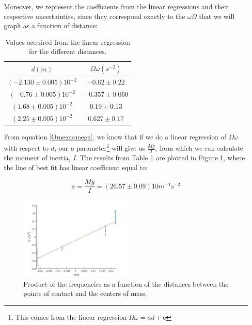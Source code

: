 \documentclass[a4paper,12pt]{article}
\begin{document}
Moreover, we represent the coefficients from the linear regressions and their respective uncertainties, since they correspond exactly to the $\omega \Omega$ that we will graph as a function of distance:

\begin{table}[H]
	\centering
  \caption{Values acquired from the linear regression for the different distances.}
  \begin{tabular}{|c|c|}
    \hline
    $d(m)$ & $\Omega \omega (s^{-2})$\\
        \hline
    $(-2.130 \pm 0.005) 10^{-2}$  & $-0.62 \pm 0.22$ \\
    \hline
    $(-0.76 \pm 0.005) 10^{-2}$ & $-0.357 \pm 0.060$ \\
    \hline
    $(1.68 \pm 0.005)10^{-2 }$ & $0.19 \pm 0.13$\\
    \hline
    $(2.25 \pm 0.005)10^{-2}$ & $0.627 \pm 0.17$\\
    \hline
  \end{tabular}
  \label{tabl:Omom}
\end{table}

From equation \eqref{Omegaomega}, we know that if we do a linear regression of $\Omega \omega$ with respect to $d$, our $a$ parameter\footnote{This comes from the linear regression  $\Omega \omega = a d + b$} will give us $\frac{Mg}{I}$, from which we can calculate the moment of inertia, $I$. The results from Table \ref{tabl:Omom} are plotted in Figure \ref{foda2}, where the line of best fit has linear coefficient equal to:

\begin{equation}
  \label{result1}
  a = \frac{Mg}{I} = (26.57 \pm 0.09)10 m^{-1}s^{-2}
\end{equation}

\begin{figure}
	\centering
	\includegraphics[width=0.5\textwidth]{part2.jpg}
	\caption{Product of the frequencies as a function of the distances between the points of contact and the centers of mass.}
	\label{foda2}
\end{figure} 
\end{document}
